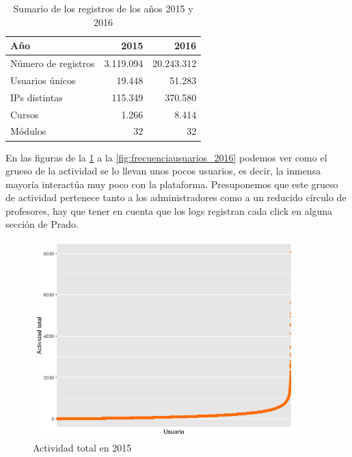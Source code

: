 \begin{table}[H]
\centering
\begin{tabular}{|l|r|r|}
\hline
\textbf{Año}        & \textbf{2015}	& \textbf{2016} 		\\ \hline
Número de registros & 3.119.094     	& 20.243.312			\\ \hline
Usuarios únicos     & 19.448        & 51.283				\\ \hline
IPs distintas       & 115.349       & 370.580			\\ \hline
Cursos              & 1.266         & 8.414				\\ \hline
Módulos             & 32            & 32					\\ \hline
\end{tabular}
\caption{Sumario de los registros de los años 2015 y 2016}
\label{table:sumarioregistros}
\end{table}

En las figuras de la \ref{fig:actividadtotal_2015} a la \ref{fig:frecuenciausuarios_2016} podemos ver como el grueso de la actividad se lo llevan unos pocos usuarios, es decir, la inmensa mayoría interactúa muy poco con la plataforma. Presuponemos que este grueso de actividad pertenece tanto a los administradores como a un reducido círculo de profesores, hay que tener en cuenta que los logs registran cada click en alguna sección de Prado.

\begin{figure}[H]
\centering
\includegraphics[width=0.9\textwidth]{../r/actividadtotal_2015}
\caption{Actividad total en 2015}
\label{fig:actividadtotal_2015}
\end{figure}

